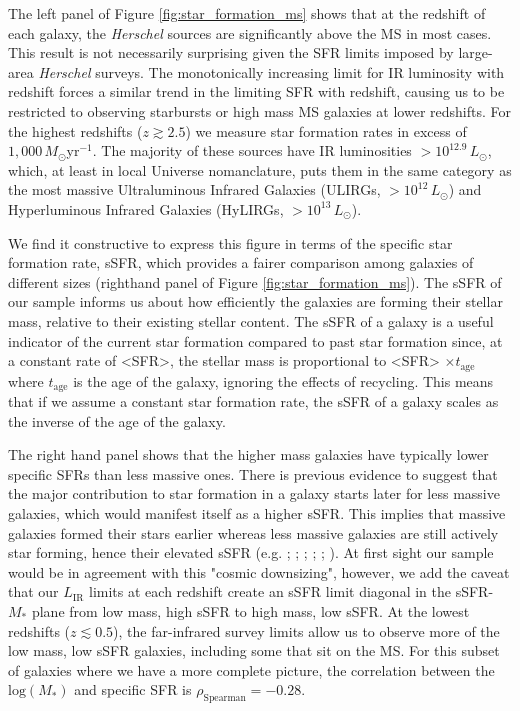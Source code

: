 The left panel of Figure \ref{fig:star_formation_ms} shows that at the redshift of each galaxy, the \textit{Herschel} sources are significantly above the MS in most cases. This result is not necessarily surprising given the SFR limits imposed by large-area \textit{Herschel} surveys. The monotonically increasing limit for IR luminosity with redshift forces a similar trend in the limiting SFR with redshift, causing us to be restricted to observing starbursts or high mass MS galaxies at lower redshifts. For the highest redshifts ($z \gtrsim 2.5$) we measure star formation rates in excess of $1,000\,M_\odot$yr$^{-1}$. The majority of these sources have IR luminosities $> 10^{12.9}\,L_\odot$, which, at least in local Universe nomanclature, puts them in the same category as the most massive Ultraluminous Infrared Galaxies (ULIRGs, $> 10^{12}\,L_\odot$) and Hyperluminous Infrared Galaxies (HyLIRGs, $> 10^{13}\,L_\odot$). 

We find it constructive to express this figure in terms of the specific star formation rate, sSFR, which provides a fairer comparison among galaxies of different sizes (righthand panel of Figure \ref{fig:star_formation_ms}). The sSFR of our sample informs us about how efficiently the galaxies are forming their stellar mass, relative to their existing stellar content. The sSFR of a galaxy is a useful indicator of the current star formation compared to past star formation since, at a constant rate of <SFR>, the stellar mass is proportional to <SFR> $\times t_{\textrm{age}}$ where $t_{\textrm{age}}$ is the age of the galaxy, ignoring the effects of recycling. This means that if we assume a constant star formation rate, the sSFR of a galaxy scales as the inverse of the age of the galaxy.

The right hand panel shows that the higher mass galaxies have typically lower specific SFRs than less massive ones. There is previous evidence to suggest that the major contribution to star formation in a galaxy starts later for less massive galaxies, which would manifest itself as a higher sSFR. This implies that massive galaxies formed their stars earlier whereas less massive galaxies are still actively star forming, hence their elevated sSFR (e.g. \citealt{Brinchmann_2000}; \citealt{Juneau_2005}; \citealt{Bell_2005}; \citealt{caputi_2006}; \citealt{Reddy_2006}; \citealt{Noeske_2007}). At first sight our sample would be in agreement with this "cosmic downsizing", however, we add the caveat that our $L_{\textrm{IR}}$ limits at each redshift create an sSFR limit diagonal in the sSFR-$M_*$ plane from low mass, high sSFR to high mass, low sSFR. At the lowest redshifts ($z \lesssim 0.5$), the far-infrared survey limits allow us to observe more of the low mass, low sSFR galaxies, including some that sit on the MS. For this subset of galaxies where we have a more complete picture, the correlation between the $\textrm{log}(M_*)$ and specific SFR is $\rho_{\textrm{Spearman}} = -0.28$.

